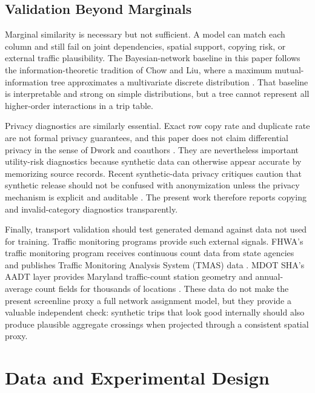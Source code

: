 \documentclass[3p,times,procedia]{elsarticle}
\begin{document}
\subsection{Validation Beyond Marginals}
Marginal similarity is necessary but not sufficient. A model can match each column and still fail on joint dependencies, spatial support, copying risk, or external traffic plausibility. The Bayesian-network baseline in this paper follows the information-theoretic tradition of Chow and Liu, where a maximum mutual-information tree approximates a multivariate discrete distribution \cite{chow1968approximating}. That baseline is interpretable and strong on simple distributions, but a tree cannot represent all higher-order interactions in a trip table.

Privacy diagnostics are similarly essential. Exact row copy rate and duplicate rate are not formal privacy guarantees, and this paper does not claim differential privacy in the sense of Dwork and coauthors \cite{dwork2006calibrating}. They are nevertheless important utility-risk diagnostics because synthetic data can otherwise appear accurate by memorizing source records. Recent synthetic-data privacy critiques caution that synthetic release should not be confused with anonymization unless the privacy mechanism is explicit and auditable \cite{stadler2022synthetic}. The present work therefore reports copying and invalid-category diagnostics transparently.

Finally, transport validation should test generated demand against data not used for training. Traffic monitoring programs provide such external signals. FHWA's traffic monitoring program receives continuous count data from state agencies and publishes Traffic Monitoring Analysis System (TMAS) data \cite{fhwa_tmas_data}. MDOT SHA's AADT layer provides Maryland traffic-count station geometry and annual-average count fields for thousands of locations \cite{mdot_aadt_2019}. These data do not make the present screenline proxy a full network assignment model, but they provide a valuable independent check: synthetic trips that look good internally should also produce plausible aggregate crossings when projected through a consistent spatial proxy.

\section{Data and Experimental Design}\label{sec:data}
\end{document}
